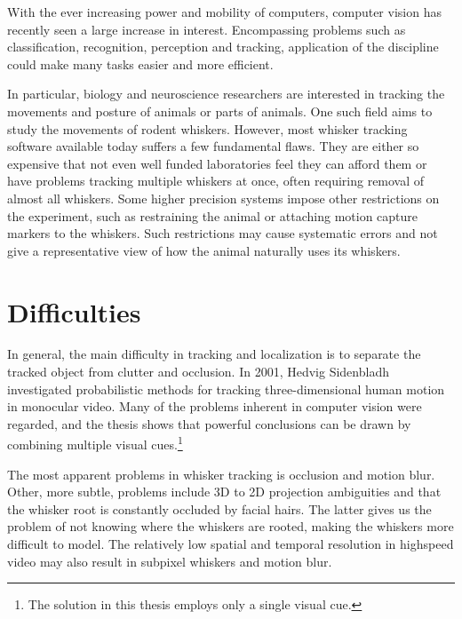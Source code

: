 With the ever increasing power and mobility of computers, computer
vision has recently seen a large increase in interest.  Encompassing
problems such as classification, recognition, perception and tracking,
application of the discipline could make many tasks easier and more
efficient.

In particular, biology and neuroscience researchers are interested in
tracking the movements and posture \cite{WhiskerVideography} of
animals or parts of animals.  One such field aims to study the
movements of rodent whiskers. However, most whisker tracking software
available today suffers a few fundamental flaws.  They are either so
expensive that not even well funded laboratories feel they can afford
them or have problems tracking multiple whiskers at once, often
requiring removal of almost all whiskers.  Some higher precision
systems impose other restrictions on the experiment, such as
restraining the animal or attaching motion capture markers to the
whiskers. \cite{BadExample1} Such restrictions may cause systematic
errors and not give a representative view of how the animal naturally
uses its whiskers.

\section{Difficulties}
In general, the main difficulty in tracking and localization is to
separate the tracked object from clutter and occlusion. In 2001,
Hedvig Sidenbladh investigated probabilistic methods for tracking
three-dimensional human motion in monocular video. \cite{Hedvig} Many
of the problems inherent in computer vision were regarded, and the
thesis shows that powerful conclusions can be drawn by combining
multiple visual cues.\footnote{The solution in this thesis employs
  only a single visual cue.}

The most apparent problems in whisker tracking is occlusion and motion
blur. Other, more subtle, problems include 3D to 2D projection
ambiguities and that the whisker root is constantly occluded by facial
hairs. The latter gives us the problem of not knowing where the
whiskers are rooted, making the whiskers more difficult to model. The
relatively low spatial and temporal resolution in highspeed video may
also result in subpixel whiskers and motion
blur.\cite{WhiskerVideography}



